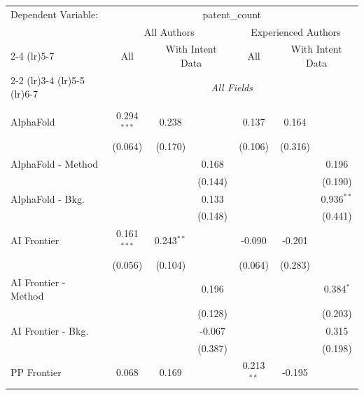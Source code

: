 \begingroup
\centering
\begin{tabular}{lcccccc}
   \tabularnewline \midrule \midrule
   Dependent Variable: & \multicolumn{6}{c}{patent\_count}\\
 & \multicolumn{3}{c}{All Authors} & \multicolumn{3}{c}{Experienced Authors} \\
\cmidrule(lr){2-4} \cmidrule(lr){5-7}
 & \multicolumn{1}{c}{All} & \multicolumn{2}{c}{With Intent Data} & \multicolumn{1}{c}{All} & \multicolumn{2}{c}{With Intent Data} \\
\cmidrule(lr){2-2} \cmidrule(lr){3-4} \cmidrule(lr){5-5} \cmidrule(lr){6-7}
 & \multicolumn{6}{c}{\textit{All Fields}} \\ \\
   AlphaFold            & 0.294$^{***}$ & 0.238        &               & 0.137        & 0.164   &   \\   
                        & (0.064)       & (0.170)      &               & (0.106)      & (0.316) &   \\   
   AlphaFold - Method   &               &              & 0.168         &              &         & 0.196\\   
                        &               &              & (0.144)       &              &         & (0.190)\\   
   AlphaFold - Bkg.     &               &              & 0.133         &              &         & 0.936$^{**}$\\   
                        &               &              & (0.148)       &              &         & (0.441)\\   
   AI Frontier          & 0.161$^{***}$ & 0.243$^{**}$ &               & -0.090       & -0.201  &   \\   
                        & (0.056)       & (0.104)      &               & (0.064)      & (0.283) &   \\   
   AI Frontier - Method &               &              & 0.196         &              &         & 0.384$^{*}$\\   
                        &               &              & (0.128)       &              &         & (0.203)\\   
   AI Frontier - Bkg.   &               &              & -0.067        &              &         & 0.315\\   
                        &               &              & (0.387)       &              &         & (0.198)\\   
   PP Frontier          & 0.068         & 0.169        &               & 0.213$^{**}$ & -0.195  &   \\   

\end{tabular}
